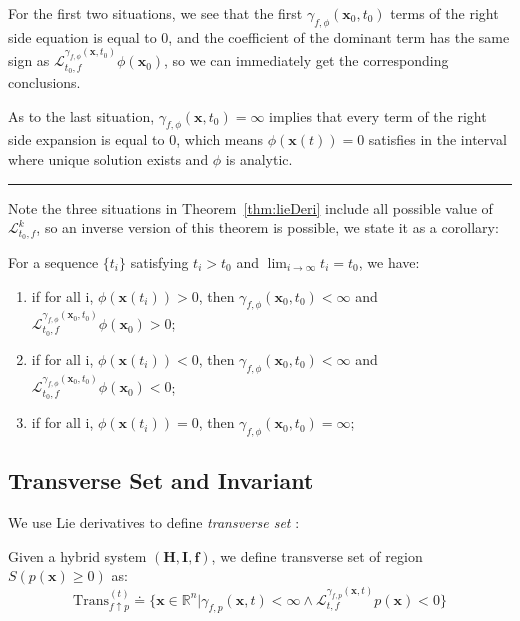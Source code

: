 \documentclass{jssc}
\newcommand{\rulex}{\hfill\rule{1mm}{3mm}}
\begin{document}
For the first two situations, we see that the first $\gamma_{f, \phi}(\boldsymbol{x}_0, t_0)$ terms of the right side equation is equal to 0, and the coefficient of the dominant term has the same sign as $\mathcal{L}_{t_0, f}^{\gamma_{f, \phi}(\boldsymbol{x}, t_0)} \phi (\boldsymbol{x}_0)$, so we can immediately get the corresponding conclusions.

As to the last situation, $\gamma_{f, \phi}(\boldsymbol{x}, t_0) = \infty$ implies that every term of the right side expansion is equal to 0, which means $\phi (\boldsymbol{x}(t)) =0$ satisfies in the interval where unique solution exists and $\phi$ is analytic.
\rulex \newline

Note the three situations in Theorem~\ref{thm:lieDeri} include all possible value of $\mathcal{L}_{t_0, f}^{k}$, so an inverse version of this theorem is possible, we state it as a corollary:

\begin{corollary}
\label{cor:lieDeri}
For a sequence $\{ t_i \}$  satisfying $t_i > t_0$ and $\lim_{i \to \infty} t_i = t_0$, we have:
\begin{enumerate}
	\item if for all i, $\phi(\boldsymbol{x}(t_i)) > 0$, then $\gamma_{f, \phi}(\boldsymbol{x}_0, t_0) < \infty$ and $\mathcal{L}_{t_0, f}^{\gamma_{f, \phi}(\boldsymbol{x}_0, t_0)} \phi (\boldsymbol{x}_0) > 0$;
	\item if for all i, $\phi(\boldsymbol{x}(t_i)) < 0$, then $\gamma_{f, \phi}(\boldsymbol{x}_0, t_0) < \infty$ and $\mathcal{L}_{t_0, f}^{\gamma_{f, \phi}(\boldsymbol{x}_0, t_0)} \phi (\boldsymbol{x}_0) < 0$;
	\item if for all i, $\phi(\boldsymbol{x}(t_i)) = 0$, then $\gamma_{f, \phi}(\boldsymbol{x}_0, t_0) = \infty$;
\end{enumerate}
\end{corollary}

\subsection{Transverse Set and Invariant}
We use Lie derivatives to define \emph{transverse set} :

\begin{definition}
\label{def:trans}
	Given a hybrid system $(\boldsymbol{H}, \boldsymbol{I}, \boldsymbol{f})$, we define transverse set of region $S(p(\boldsymbol{x}) \geq 0)$ as:
	\begin{equation*}
		\mathrm{Trans}_{f \uparrow p}^{(t)} \doteq \{\boldsymbol{x} \in \mathbb{R}^n | \gamma_{f, p}(\boldsymbol{x}, t) < \infty \wedge \mathcal{L}_{t, f}^{\gamma_{f, p}(\boldsymbol{x}, t)} p(\boldsymbol{x}) < 0 \}
	\end{equation*}
\end{definition}
\end{document}
